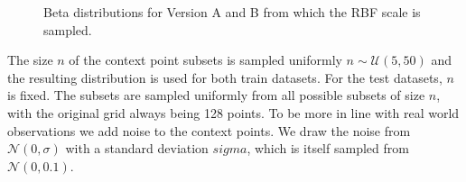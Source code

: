 \begin{figure}
	\centering
	\resizebox{0.4\textwidth}{!}{
		
	}
	\caption{Beta distributions for Version A and B from which the RBF scale is sampled.}
	\label{fig:beta_scales}
\end{figure}

The size $n$ of the context point subsets is sampled uniformly $n\sim \mathcal{U}(5,50)$ and the resulting distribution is used for both train datasets.  For the test datasets, $n$ is fixed. The subsets are sampled uniformly from all possible subsets of size $n$, with the original grid always being 128 points. To be more in line with real world observations we add noise to the context points. We draw the noise from $\mathcal{N}(0,\sigma)$ with a standard deviation $sigma$, which is itself sampled from $\mathcal{N}(0,0.1)$.